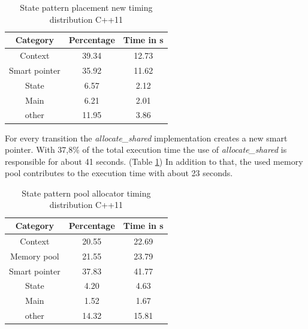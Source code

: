 {\begin{table}[h]\begin{center}
\begin{tabular}{|c|c|c|}\hline
\textbf{Category} & \textbf{Percentage} & \textbf{Time in s}\\
\hline
Context & 39.34 & 12.73\\
\hline
Smart pointer & 35.92 & 11.62\\
\hline
State & 6.57 & 2.12\\
\hline
Main & 6.21 & 2.01\\
\hline
other & 11.95 & 3.86\\
\hline
\end{tabular}
\caption{State pattern placement new timing distribution C++11}
\label{tab:StatePatternPlacementNewTimingDistributionCpp11}
\end{center}\end{table}

\noindent For every transition the \emph{allocate\_shared} implementation creates a new smart pointer. With 37,8\% of the total execution time the use of \emph{allocate\_shared} is responsible for about 41 seconds. (Table \ref{tab:StatePatternPlacementNewTimingDistributionCpp11}) In addition to that, the used memory pool contributes to the execution time with about 23 seconds. 

\begin{table}[h]\begin{center}
\begin{tabular}{|c|c|c|}\hline
\textbf{Category} & \textbf{Percentage} & \textbf{Time in s}\\
\hline
Context & 20.55 & 22.69\\
\hline
Memory pool & 21.55 & 23.79\\
\hline
Smart pointer & 37.83 & 41.77\\
\hline
State & 4.20 & 4.63\\
\hline
Main & 1.52 & 1.67\\
\hline
other & 14.32 & 15.81\\
\hline
\end{tabular}
\caption{State pattern pool allocator timing distribution C++11}
\label{tab:StatePatternPoolAllocatorTimingDistributionCpp11}
\end{center}\end{table}
\FloatBarrier

}
